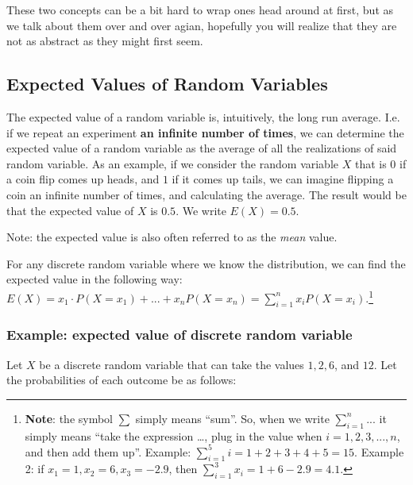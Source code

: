 \documentclass[]{book}
\let\rmarkdownfootnote\footnote%
\def\footnote{\protect\rmarkdownfootnote}
\theoremstyle{definition}
\theoremstyle{definition}
\theoremstyle{definition}
\theoremstyle{remark}
\begin{document}
These two concepts can be a bit hard to wrap ones head around at first, but as we talk about them over and over agian, hopefully you will realize that they are not as abstract as they might first seem.

\hypertarget{expected-values-of-random-variables}{%
\subsection{Expected Values of Random Variables}\label{expected-values-of-random-variables}}

The expected value of a random variable is, intuitively, the long run average. I.e. if we repeat an experiment \textbf{an infinite number of times}, we can determine the expected value of a random variable as the average of all the realizations of said random variable. As an example, if we consider the random variable \(X\) that is \(0\) if a coin flip comes up heads, and \(1\) if it comes up tails, we can imagine flipping a coin an infinite number of times, and calculating the average. The result would be that the expected value of \(X\) is \(0.5\). We write \(E(X) = 0.5\).

Note: the expected value is also often referred to as the \emph{mean} value.

For any discrete random variable where we know the distribution, we can find the expected value in the following way: \(E(X) = x_1 \cdot P(X = x_1) + ... + x_n P(X = x_n) = \sum_{i=1}^n x_i P(X = x_i)\).\footnote{\textbf{Note}: the symbol \(\sum\) simply means ``sum''. So, when we write \(\sum_{i=1}^n ...\) it simply means ``take the expression \ldots, plug in the value when \(i=1,2,3,...,n\), and then add them up''. Example: \(\sum_{i=1}^5 i = 1 + 2 + 3 + 4 + 5 = 15\). Example 2: if \(x_1 = 1, x_2 = 6, x_3 = -2.9\), then \(\sum_{i = 1}^3 x_i = 1 + 6 - 2.9 = 4.1\).}

\hypertarget{example-expected-value-of-discrete-random-variable}{%
\subsubsection{Example: expected value of discrete random variable}\label{example-expected-value-of-discrete-random-variable}}

Let \(X\) be a discrete random variable that can take the values \(1,2,6\), and \(12\). Let the probabilities of each outcome be as follows:
\end{document}
